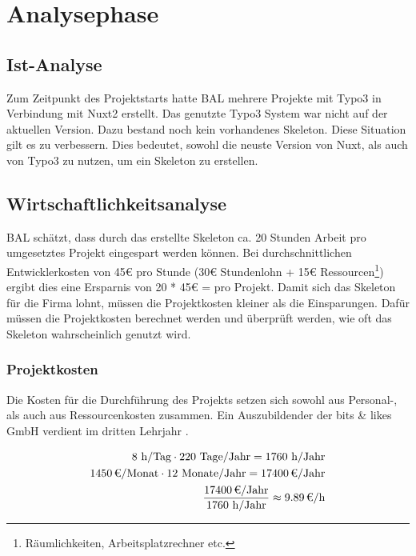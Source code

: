 \section{Analysephase} 
\label{sec:Analysephase}


\subsection{Ist-Analyse} 
\label{sec:IstAnalyse}

Zum Zeitpunkt des Projektstarts hatte \acs{BAL} mehrere Projekte mit Typo3 in Verbindung mit Nuxt2 erstellt. Das genutzte Typo3 System war nicht auf der aktuellen Version. Dazu bestand noch kein vorhandenes Skeleton. Diese Situation gilt es zu verbessern. Dies bedeutet, sowohl die neuste Version von Nuxt, als auch von Typo3 zu nutzen, um ein Skeleton zu erstellen.


\subsection{Wirtschaftlichkeitsanalyse}
\label{sec:Wirtschaftlichkeitsanalyse}

\acs{BAL} schätzt, dass durch das erstellte Skeleton ca. 20 Stunden Arbeit pro umgesetztes Projekt eingespart werden können. Bei durchschnittlichen Entwicklerkosten von 45€ pro Stunde (30€ Stundenlohn + 15€ Ressourcen\footnote{Räumlichkeiten, Arbeitsplatzrechner etc.}) ergibt dies eine Ersparnis von 20 * 45€ =  pro Projekt. Damit sich das Skeleton für die Firma lohnt, müssen die Projektkosten kleiner als die Einsparungen. Dafür müssen die Projektkosten berechnet werden und überprüft werden, wie oft das Skeleton wahrscheinlich genutzt wird.


\subsubsection{Projektkosten}
\label{sec:Projektkosten}

Die Kosten für die Durchführung des Projekts setzen sich sowohl aus Personal-, als auch aus Ressourcenkosten zusammen.
Ein Auszubildender der bits \& likes GmbH verdient im dritten Lehrjahr .

\begin{eqnarray}
8 \mbox{ h/Tag} \cdot 220 \mbox{ Tage/Jahr} = 1760 \mbox{ h/Jahr}\\
\eur{1450}\mbox{/Monat} \cdot 12 \mbox{ Monate/Jahr} = \eur{17400} \mbox{/Jahr}\\
\frac{\eur{17400} \mbox{/Jahr}}{1760 \mbox{ h/Jahr}} \approx \eur{9.89}\mbox{/h}
\end{eqnarray}

